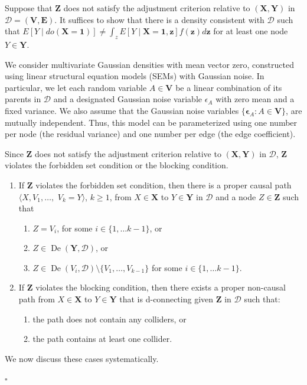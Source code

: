 \documentclass[11pt,a4paper]{article}
\newenvironment{proofof}[1][]{\begin{trivlist}
   \item[\hskip \labelsep {\bfseries Proof of #1.}]}{\hfill{}$\square$\end{trivlist}}
\DeclareMathOperator{\De}{De}
\newcommand{\forb}{the forbidden set condition\xspace}
\newcommand{\blck}{the blocking condition\xspace}
\newcommand{\g}[1][G]{\mathcal{#1}}
\begin{document}
\begin{proofof}[Theorem~\ref{theorem:completeness ac}]
Suppose that $\mathbf{Z}$ does not satisfy the adjustment criterion relative to $(\mathbf{X,Y})$ in $\g[D] = (\mathbf{V},\mathbf{E})$. It suffices to show that there is a density consistent with $\g[D]$ such that $E[ Y \mid do(\mathbf{X =1}) ] \neq \int_z E[ Y \mid \mathbf{X=1},\mathbf{z} ]f(\mathbf{z})d\mathbf{z}$ for at least one node $Y \in \mathbf{Y}$.

We consider multivariate Gaussian densities with mean vector zero, constructed using linear structural equation models (SEMs) with Gaussian noise. In particular, we let each random variable $A \in \mathbf{V}$ be a linear combination of its parents in $\g[D]$ and a designated Gaussian noise variable $\epsilon_{A}$ with zero mean and a fixed variance. We also assume that the Gaussian noise variables $\{\mathbf{\epsilon}_{A}: A \in \mathbf{V}\}$, are mutually independent. Thus, this model can be parameterized using one
number per node (the residual variance) and one number per edge
(the edge coefficient).

Since $\mathbf{Z}$ does not satisfy the adjustment criterion relative to $\mathbf{(X,Y)}$ in $\g[D]$, $\mathbf{Z}$ violates \forb{} or \blck{}.
\begin{enumerate}[label=\arabic*]
\item\label{I} If $\mathbf{Z}$ violates \forb{}, then there is a proper causal path $\langle X, V_1 , \dots ,$ $V_k=Y \rangle$, $k\ge 1$, from $X \in \mathbf{X}$ to $Y \in \mathbf{Y}$ in $\g[D]$ and a node $Z \in \mathbf{Z}$ such that
\begin{enumerate}[label=(\alph*)]
\item\label{noforb1} $Z =V_i$, for some $i \in \{1,\dots k-1\}$, or
\item\label{noforb2} $Z \in \De(\mathbf{Y},\g[D])$, or
\item\label{noforb3} $Z \in \De(V_i,\g[D]) \setminus \{V_1,\dots,V_{k-1}\}$ for some $i \in \{1,\dots k-1\}$.
\end{enumerate}
\item\label{II} If $\mathbf{Z}$ violates \blck{}, then there exists a proper non-causal path from $X \in \mathbf{X}$ to $Y \in \mathbf{Y}$ that is d-connecting given $\mathbf{Z}$ in $\g[D]$ such that:
\begin{enumerate}[label=(\alph*)]
\item\label{noblck1} the path does not contain any colliders, or
\item\label{noblck2} the path contains at least one collider.
\end{enumerate}
\end{enumerate}
We now discuss these cases systematically.


\end{proofof}
\end{document}
